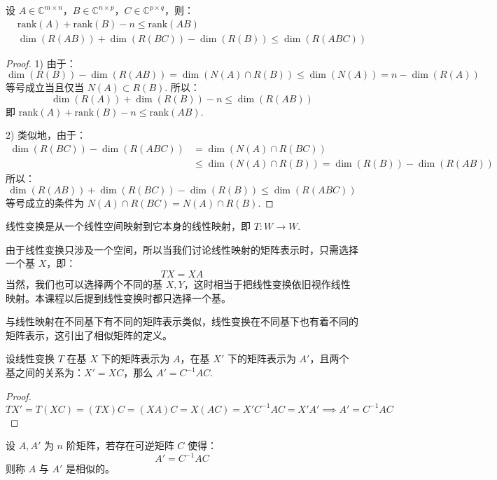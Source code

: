 \begin{corollary}
设 $A\in\mathbb C^{m\times n}$，$B\in\mathbb C^{n\times p}$，$C\in\mathbb C^{p\times q}$，则：
\begin{align*}
    &\text{rank}(A)+\text{rank}(B)-n\leq \text{rank}(AB)\\
    &\dim(R(AB))+\dim(R(BC))-\dim(R(B))\leq \dim(R(ABC))
\end{align*}
\end{corollary}
\begin{proof}
1) 由于：
\[
    \dim(R(B))-\dim(R(AB))=\dim(N(A)\cap R(B))\leq\dim(N(A))=n-\dim(R(A))
\]
等号成立当且仅当 $N(A)\subset R(B)$. 所以：
\[
    \dim(R(A))+\dim(R(B))-n\leq\dim(R(AB))
\]
即 $\text{rank}(A)+\text{rank}(B)-n\leq \text{rank}(AB)$.

2) 类似地，由于：
\begin{align*}
    \dim(R(BC))-\dim(R(ABC))&=\dim(N(A)\cap R(BC))\\
    &\leq \dim(N(A)\cap R(B))=\dim(R(B))-\dim(R(AB))
\end{align*}
所以：
\[
    \dim(R(AB))+\dim(R(BC))-\dim(R(B))\leq \dim(R(ABC))
\]
等号成立的条件为 $N(A)\cap R(BC)=N(A)\cap R(B)$.
\end{proof}

\begin{definition}[线性变换]
线性变换是从一个线性空间映射到它本身的线性映射，即 $T:W\to W$.
\end{definition}

\begin{definition}[线性变换的矩阵表示]
由于线性变换只涉及一个空间，所以当我们讨论线性映射的矩阵表示时，只需选择一个基 $X$，即：
\[TX=XA\]
当然，我们也可以选择两个不同的基 $X,Y$，这时相当于把线性变换依旧视作线性映射。本课程以后提到线性变换时都只选择一个基。
\end{definition}

与线性映射在不同基下有不同的矩阵表示类似，线性变换在不同基下也有着不同的矩阵表示，这引出了相似矩阵的定义。

\begin{theorem}[线性变换在不同基下的矩阵表示]
\label{thm:sim-trans}
设线性变换 $T$ 在基 $X$ 下的矩阵表示为 $A$，在基 $X'$ 下的矩阵表示为 $A'$，且两个基之间的关系为：$X'=XC$，那么 $A'=C^{-1}AC$.
\end{theorem}
\begin{proof}
\[
TX'=T(XC)=(TX)C=(XA)C=X(AC)=X'C^{-1}AC=X'A'\implies A'=C^{-1}AC
\]
\end{proof}

\begin{definition}[相似矩阵]
设 $A,A'$ 为 $n$ 阶矩阵，若存在可逆矩阵 $C$ 使得：
\[A'=C^{-1}AC\]
则称 $A$ 与 $A'$ 是相似的。
\end{definition}

